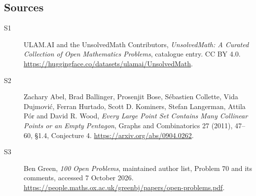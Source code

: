 \documentclass[11pt]{article}
\begin{document}
\subsection{Sources}
\begin{description}
\item[\hypertarget{source:statement:1}{S1}] ULAM.AI and the UnsolvedMath Contributors, \emph{UnsolvedMath: A Curated Collection of Open Mathematics Problems}, catalogue entry. CC BY 4.0. \url{https://huggingface.co/datasets/ulamai/UnsolvedMath}.
\item[\hypertarget{source:statement:2}{S2}] Zachary Abel, Brad Ballinger, Prosenjit Bose, Sébastien Collette, Vida Dujmović, Ferran Hurtado, Scott D. Kominers, Stefan Langerman, Attila Pór and David R. Wood, \emph{Every Large Point Set Contains Many Collinear Points or an Empty Pentagon}, Graphs and Combinatorics 27 (2011), 47--60, §1.4, Conjecture 4. \url{https://arxiv.org/abs/0904.0262}.
\item[\hypertarget{source:statement:3}{S3}] Ben Green, \emph{100 Open Problems}, maintained author list, Problem 70 and its comments, accessed 7 October 2026. \url{https://people.maths.ox.ac.uk/greenbj/papers/open-problems.pdf}.
\end{description}
\label{end:statement}
\end{document}
